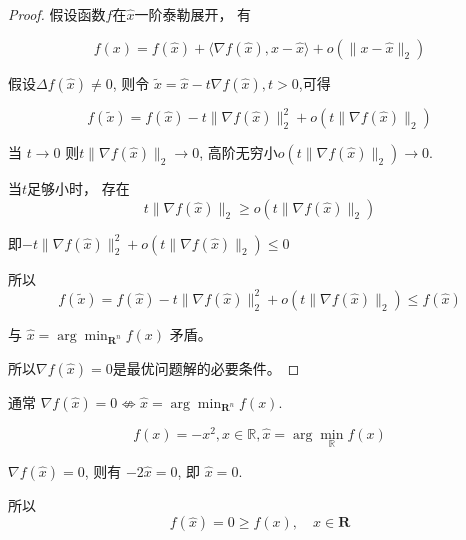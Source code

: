 \begin{proof}
    假设函数$f$在$\hat{x}$一阶泰勒展开， 有

    \begin{equation} f(x)=f(\hat{x})+\langle\nabla f(\hat{x}), x-\hat{x}\rangle+o\left(\|x-\hat{x}\|_{2}\right) \end{equation}

    假设$ \Delta f(\hat{x}) \neq 0 $, 则令 $ \tilde{x}=\hat{x}-t \nabla f(\hat{x}), t>0 $,可得

    \begin{equation} f(\tilde{x})=f(\hat{x})-t\|\nabla f(\hat{x})\|_{2}^{2}+o\left(t\|\nabla f(\hat{x})\|_{2}\right) \end{equation}

    当 $ t \rightarrow 0 $ 则$ t\|\nabla f(\hat{x})\|_{2} \rightarrow 0 $,  高阶无穷小$ {o }\left(t\|\nabla f(\hat{x})\|_{2}\right) \rightarrow 0 $.

    当$t$足够小时， 存在\begin{equation} t\|\nabla f(\hat{x})\|_{2} \geq o\left(t\|\nabla f(\hat{x})\|_{2}\right) \end{equation}
    
    即$ -t\|\nabla f(\hat{x})\|_{2}^{2}+o\left(t\|\nabla f(\hat{x})\|_{2}\right) \leq 0 $

    所以
    \begin{equation} f(\tilde{x})=f(\hat{x})-t\|\nabla f(\hat{x})\|_{2}^{2}+o\left(t\|\nabla f(\hat{x})\|_{2}\right) \leq f(\hat{x}) \end{equation}
    
    与 $ \hat{x}=\arg \min _{\mathbf{R}^{n}} f(x) $ 矛盾。 

    所以$ \nabla f(\widehat{x})=0 $是最优问题解的必要条件。 
\end{proof}

\begin{remark}
    通常 $ \nabla f(\hat{x})=0 \not \Leftrightarrow \hat{x}=\arg \min _{\mathbf{R}^{n}} f(x) $. 
\end{remark}

\begin{example}
    \begin{equation} f(x)=-x^{2},  x \in \mathbb{R}, \hat{x}=\arg \min _{\mathbb{R}} f(x) \end{equation}

    $ \nabla f(\hat{x})=0 $, 则有 $ -2 \hat{x}=0 $, 即 $ \hat{x}=0 $.

    所以
    \begin{equation} f(\hat{x})=0 \geq f(x), \quad x \in \mathbf{R} \end{equation}


\end{example}

